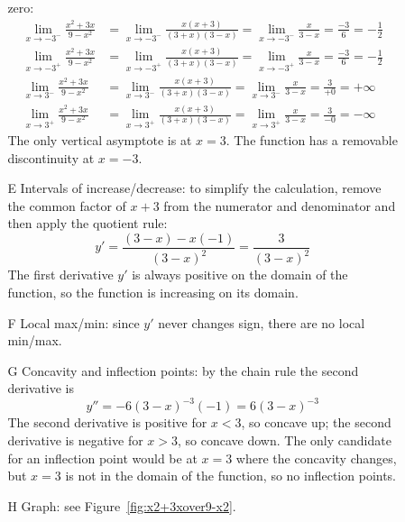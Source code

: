 \documentclass{article}
\begin{document}
\begin{enumerate}
\begin{enumerate}
\begin{itemize}
      zero:
      \begin{align*}
        \lim_{x\to -3^-} \frac{x^2+3x}{9-x^2}
        &= \lim_{x\to -3^-} \frac{x(x+3)}{(3+x)(3-x)}
          = \lim_{x\to -3^-} \frac{x}{3-x} = \frac{-3}{6} = -\frac{1}{2} \\
        \lim_{x\to -3^+} \frac{x^2+3x}{9-x^2}
        &= \lim_{x\to -3^+} \frac{x(x+3)}{(3+x)(3-x)}
          = \lim_{x\to -3^+} \frac{x}{3-x} = \frac{-3}{6} = -\frac{1}{2} \\
        \lim_{x\to 3^-} \frac{x^2+3x}{9-x^2}
        &= \lim_{x\to 3^-} \frac{x(x+3)}{(3+x)(3-x)}
          = \lim_{x\to 3^-} \frac{x}{3-x} = \frac{3}{+0} = +\infty \\
        \lim_{x\to 3^+} \frac{x^2+3x}{9-x^2}
        &= \lim_{x\to 3^+} \frac{x(x+3)}{(3+x)(3-x)}
          = \lim_{x\to 3^+} \frac{x}{3-x} = \frac{3}{-0} = -\infty
      \end{align*}
      The only vertical asymptote is at $x=3$.  The function has a
      removable discontinuity at $x=-3$.
    \item[E] Intervals of increase/decrease: to simplify the
      calculation, remove the common factor of $x+3$ from the
      numerator and denominator and then apply the quotient rule:
      \begin{displaymath}
        y'=\frac{(3-x)-x(-1)}{(3-x)^2} = \frac{3}{(3-x)^2}
      \end{displaymath}
      The first derivative $y'$ is always positive on the domain of
      the function, so the function is increasing on its domain.
    \item[F] Local max/min: since $y'$ never changes sign, there are
      no local min/max.
    \item[G] Concavity and inflection points: by the chain rule the
      second derivative is
      \begin{displaymath}
        y'' = -6(3-x)^{-3}(-1) = 6(3-x)^{-3}
      \end{displaymath}
      The second derivative is positive for $x<3$, so concave up; the
      second derivative is negative for $x>3$, so concave down.  The
      only candidate for an inflection point would be at $x=3$ where
      the concavity changes, but $x=3$ is not in the domain of the
      function, so no inflection points.
    \item[H] Graph: see Figure~\ref{fig:x2+3xover9-x2}.
    \end{itemize}
    \begin{figure}[htbp]
      \centering
      \begin{tikzpicture}

\end{tikzpicture}
\end{figure}
\end{enumerate}
\end{enumerate}
\end{document}
